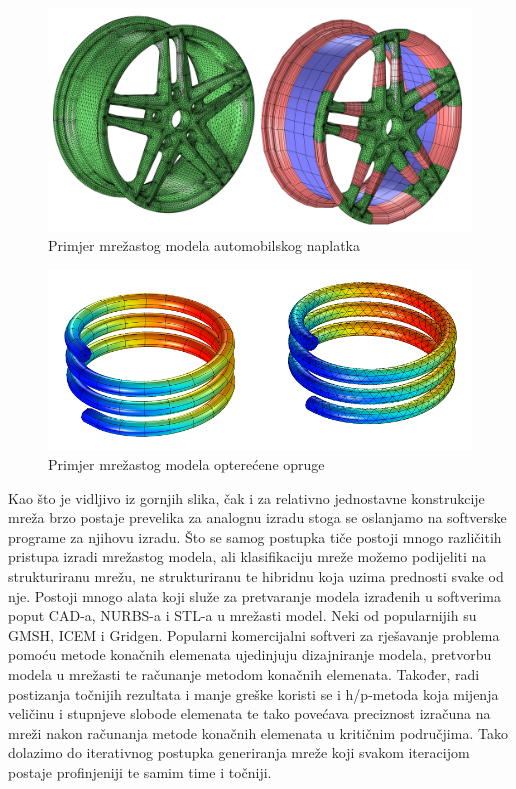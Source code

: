 \documentclass[a4paper,twoside,12pt]{memoir} %
\begin{document}
\begin{figure}[h!t]
\begin{center}
\includegraphics[scale=0.2]{pictures/chapter_fem/Wheel-rim-mesh-example-large.png}
\caption{Primjer mrežastog modela automobilskog naplatka \cite{comslo_mesh}}
\label{fig:mesh_rim}
\end{center}
\end{figure}

\begin{figure}[h!t]
\begin{center}
\includegraphics[scale=0.6]{pictures/chapter_fem/Loaded-spring-example.png}
\caption{Primjer mrežastog modela opterećene opruge \cite{comslo_mesh}}
\label{fig:mesh_spring}
\end{center}
\end{figure}

\par
Kao što je vidljivo iz gornjih slika, čak i za relativno jednostavne konstrukcije mreža brzo postaje prevelika za analognu izradu stoga se oslanjamo na softverske programe za njihovu izradu. Što se samog postupka tiče postoji mnogo različitih pristupa izradi mrežastog modela, ali klasifikaciju mreže možemo podijeliti na strukturiranu mrežu, ne strukturiranu te hibridnu koja uzima prednosti svake od nje. Postoji mnogo alata koji služe za pretvaranje modela izrađenih u softverima poput CAD-a, NURBS-a i STL-a u mrežasti model. Neki od popularnijih su GMSH, ICEM i Gridgen. Popularni komercijalni softveri za rješavanje problema pomoću metode konačnih elemenata ujedinjuju dizajniranje modela, pretvorbu modela u mrežasti te računanje metodom konačnih elemenata. Također, radi postizanja točnijih rezultata i manje greške koristi se i h/p-metoda koja mijenja veličinu i stupnjeve slobode elemenata te tako povećava preciznost izračuna na mreži nakon računanja metode konačnih elemenata u kritičnim područjima. Tako dolazimo do iterativnog postupka generiranja mreže koji svakom iteracijom postaje profinjeniji te samim time i točniji. \par 
\end{document}
